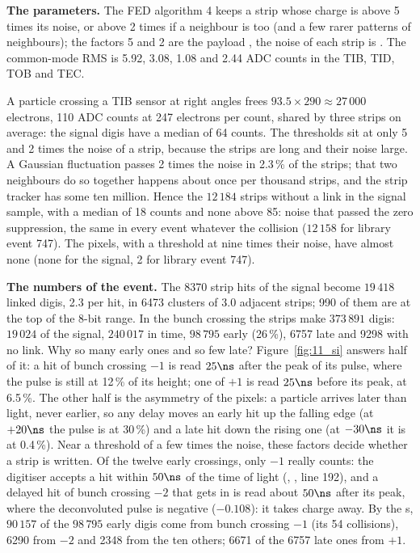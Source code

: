 \textbf{The parameters.} The FED algorithm 4 keeps a strip whose charge is above 5 times its noise, or above 2 times if
a neighbour is too (and a few rarer patterns of neighbours); the factors 5 and 2 are the payload
, the noise of each strip is . The common-mode RMS is 5.92,
3.08, 1.08 and 2.44 ADC counts in the TIB, TID, TOB and TEC.

\begin{plainwords}
A particle crossing a TIB sensor at right angles frees $93.5\times290\approx27\,000$ electrons, 110 ADC counts at 247
electrons per count, shared by three strips on average: the signal digis have a median of 64 counts. The thresholds
sit at only 5 and 2 times the noise of a strip, because the strips are long and their noise large. A Gaussian
fluctuation passes 2 times the noise in 2.3\,\% of the strips; that two neighbours do so together happens about once
per thousand strips, and the strip tracker has some ten million. Hence the $12\,184$ strips without a link in the
signal sample, with a median of 18 counts and none above 85: noise that passed the zero suppression, the same in every
event whatever the collision ($12\,158$ for library event 747). The pixels, with a threshold at nine times their
noise, have almost none (none for the signal, 2 for library event 747).
\end{plainwords}

\textbf{The numbers of the event.} The 8370 strip hits of the signal become $19\,418$ linked digis, 2.3 per hit, in
6473 clusters of 3.0 adjacent strips; 990 of them are at the top of the 8-bit range. In the bunch crossing the strips
make $373\,891$ digis: $19\,024$ of the signal, $240\,017$ in time, $98\,795$ early (26\,\%), 6757 late and 9298 with
no link. Why so many early ones and so few late? Figure~\ref{fig:11_si} answers half of it: a hit of bunch crossing $-1$
is read $25\ns$ after the peak of its pulse, where the pulse is still at 12\,\% of its height; one of $+1$ is read
$25\ns$ before its peak, at 6.5\,\%. The other half is the asymmetry of the pixels: a particle arrives later than light,
never earlier, so any delay moves an early hit up the falling edge (at $+20\ns$ the pulse is at 30\,\%) and a late hit
down the rising one (at $-30\ns$ it is at 0.4\,\%). Near a threshold of a few times the noise, these factors decide
whether a strip is written. Of the twelve early crossings, only $-1$ really counts: the digitiser accepts a hit within
$50\ns$ of the time of light (, , line 192), and a
delayed hit of bunch crossing $-2$ that gets in is read about $50\ns$ after its peak, where the deconvoluted pulse is
negative ($-0.108$): it takes charge away. By the s, $90\,157$ of the $98\,795$ early digis come from
bunch crossing $-1$ (its 54 collisions), 6290 from $-2$ and 2348 from the ten others; 6671 of the 6757 late ones from $+1$.

